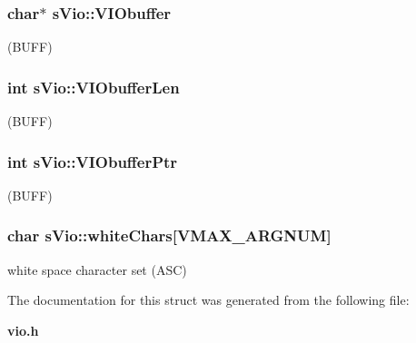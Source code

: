 \subsubsection[{VIObuffer}]{\setlength{\rightskip}{0pt plus 5cm}char$\ast$ {\bf sVio::VIObuffer}}\label{a00002_ad05a71a18ce91d54c9e90f6f24a6e0d5}
(BUFF) 
\subsubsection[{VIObufferLen}]{\setlength{\rightskip}{0pt plus 5cm}int {\bf sVio::VIObufferLen}}\label{a00002_aaa457bd84691d96861e3c7792006517c}
(BUFF) 
\subsubsection[{VIObufferPtr}]{\setlength{\rightskip}{0pt plus 5cm}int {\bf sVio::VIObufferPtr}}\label{a00002_a615098ef767bb9dd01bd2629b1b8d8be}
(BUFF) 
\subsubsection[{whiteChars}]{\setlength{\rightskip}{0pt plus 5cm}char {\bf sVio::whiteChars}[VMAX\_\-ARGNUM]}\label{a00002_aa478abe4d4059c9b597ffc3181b9460e}
white space character set (ASC) 

The documentation for this struct was generated from the following file:\begin{DoxyCompactItemize}
\item 
{\bf vio.h}\end{DoxyCompactItemize}
